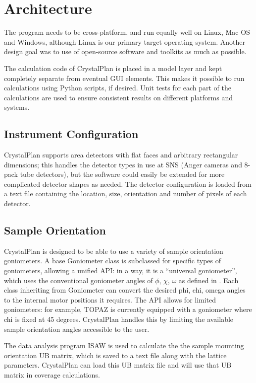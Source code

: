 \documentclass{iucr}              %
\begin{document}
\section{Architecture}

The program needs to be cross-platform, and run equally well on Linux, Mac OS
and Windows, although Linux is our primary target operating system. Another
design goal was to use of open-source software and toolkits as much as possible. 


The calculation code of CrystalPlan is placed in a model layer and kept
completely separate from eventual GUI elements. This makes it possible to run
calculations using Python scripts, if desired. Unit tests for each part of the
calculations are used to ensure consistent results on different platforms and
systems.    
 

\subsection{Instrument Configuration}

CrystalPlan supports area detectors with flat faces and arbitrary rectangular
dimensions; this handles the detector types in use at SNS (Anger cameras and
8-pack tube detectors), but the software could easily be extended for more
complicated detector shapes as needed. The detector configuration is loaded from
a text file containing the location, size, orientation and number of pixels of
each detector. 


\subsection{Sample Orientation}

CrystalPlan is designed to be able to use a variety of sample orientation
goniometers. A base Goniometer class is subclassed for specific types of
goniometers, allowing a unified API: in a way, it is a “universal goniometer”,
which uses the conventional goniometer angles of $\phi$, $\chi$, $\omega$ as
defined in \cite{knuth84}. Each class inheriting from Goniometer can convert
the desired phi, chi, omega angles to the internal motor positions it requires. The API allows
for limited goniometers: for example, TOPAZ is currently equipped with a
goniometer where chi is fixed at 45 degrees. CrystalPlan handles this by
limiting the available sample orientation angles accessible to the user.        
 
The data analysis program ISAW is used to calculate the the sample mounting
orientation UB matrix, which is saved to a text file along with the lattice
parameters. CrystalPlan can load this UB matrix file and will use that UB matrix
in coverage calculations.
\end{document}
